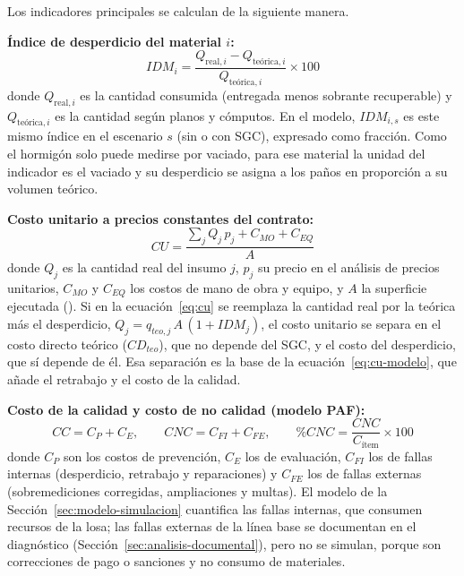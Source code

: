 Los indicadores principales se calculan de la siguiente manera.

\textbf{Índice de desperdicio del material $i$:}
\begin{equation}
  IDM_i = \frac{Q_{\text{real},i} - Q_{\text{teórica},i}}{Q_{\text{teórica},i}} \times 100
  \label{eq:idm}
\end{equation}
donde $Q_{\text{real},i}$ es la cantidad consumida (entregada menos sobrante recuperable) y $Q_{\text{teórica},i}$ es la cantidad según planos y cómputos. En el modelo, $IDM_{i,s}$ es este mismo índice en el escenario $s$ (sin o con SGC), expresado como fracción. Como el hormigón solo puede medirse por vaciado, para ese material la unidad del indicador es el vaciado y su desperdicio se asigna a los paños en proporción a su volumen teórico.

\textbf{Costo unitario a precios constantes del contrato:}
\begin{equation}
  CU = \frac{\sum_{j} Q_{j}\, p_{j} + C_{MO} + C_{EQ}}{A}
  \label{eq:cu}
\end{equation}
donde $Q_j$ es la cantidad real del insumo $j$, $p_j$ su precio en el análisis de precios unitarios, $C_{MO}$ y $C_{EQ}$ los costos de mano de obra y equipo, y $A$ la superficie ejecutada (\mdos{}). Si en la ecuación~\eqref{eq:cu} se reemplaza la cantidad real por la teórica más el desperdicio, $Q_j = q_{teo,j}\,A\,(1 + IDM_j)$, el costo unitario se separa en el costo directo teórico ($CD_{teo}$), que no depende del SGC, y el costo del desperdicio, que sí depende de él. Esa separación es la base de la ecuación~\eqref{eq:cu-modelo}, que añade el retrabajo y el costo de la calidad.

\textbf{Costo de la calidad y costo de no calidad (modelo PAF):}
\begin{equation}
  CC = C_{P} + C_{E}, \qquad CNC = C_{FI} + C_{FE}, \qquad \%CNC = \frac{CNC}{C_{\text{ítem}}} \times 100
  \label{eq:cnc}
\end{equation}
donde $C_P$ son los costos de prevención, $C_E$ los de evaluación, $C_{FI}$ los de fallas internas (desperdicio, retrabajo y reparaciones) y $C_{FE}$ los de fallas externas (sobremediciones corregidas, ampliaciones y multas). El modelo de la Sección~\ref{sec:modelo-simulacion} cuantifica las fallas internas, que consumen recursos de la losa; las fallas externas de la línea base se documentan en el diagnóstico (Sección~\ref{sec:analisis-documental}), pero no se simulan, porque son correcciones de pago o sanciones y no consumo de materiales.

